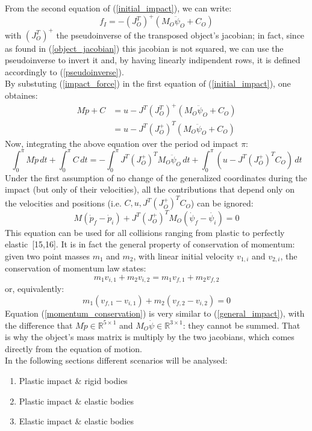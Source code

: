 \documentclass[a4paper,12pt,oneside]{report}
\begin{document}
From the second equation of (\ref{initial_impact}), we can write:
\begin{equation}
  f_I=-(J_O^T)^+(M_O\ddot{\psi}_O+C_O)
  \label{impact_force}
\end{equation}
with $(J_O^T)^+$ the pseudoinverse of the transposed object's jacobian; in fact, since as found in (\ref{object_jacobian}) this jacobian is not squared, we can use the pseudoinverse to invert it and, by having linearly indipendent rows, it is defined accordingly to (\ref{pseudoinverse}).\\
By substuting (\ref{impact_force}) in the first equation of (\ref{initial_impact}), one obtaines:
\begin{equation}
  \begin{split}
  M\ddot{p}+C&=u-J^T(J_O^T)^+(M_O\ddot{\psi}_O+C_O)\\
  &=u-J^T(J_O^+)^T(M_O\ddot{\psi}_O+C_O)
  \end{split}
\end{equation}
Now, integrating the above equation over the period od impact $\pi$:
\begin{equation}
  \int_{0}^{\pi}M\ddot{p}\,dt+\int_{0}^{\pi}C\,dt =-\int_{0}^{\pi}J^T(J_O^+)^TM_O\ddot{\psi}_O\,dt+\int_{0}^{\pi}(u-J^T(J_O^+)^TC_O)\,dt
\end{equation}
Under the first assumption of no change of the generalized coordinates during the impact (but only of their velocities), all the contributions that depend only on the velocities and positions (i.e. $C,u,J^T(J_O^+)^TC_O$) can be ignored:
\begin{equation}
  M(\dot{p}_f-\dot{p}_i)+J^T(J_O^+)^TM_O(\dot{\psi}_f-\dot{\psi_i})=0
  \label{general_impact}
\end{equation}
This equation can be used for all collisions ranging from plastic to perfectly elastic~[15,16]. It is in fact the general property of conservation of momentum:  given two point masses $m_1$ and $m_2$, with linear initial velocity $v_{1,i}$ and $v_{2,i}$, the conservation of momentum law states:
\begin{equation}
  m_1v_{i,1}+m_2v_{i,2}=m_1v_{f,1}+m_2v_{f,2}
\end{equation}
or, equivalently:
\begin{equation}
  m_1(v_{f,1}-v_{i,1})+m_2(v_{f,2}-v_{i,2})=0
  \label{momentum_conservation}
\end{equation}
Equation (\ref{momentum_conservation}) is very similar to (\ref{general_impact}), with the difference that $M\dot{p}\in \mathbb{R}^{5\times 1}$ and $M_O\dot{\psi}\in \mathbb{R}^{3\times 1}$: they cannot be summed. That is why the object's mass matrix is multiply by the two jacobians, which comes directly from the equation of motion.\\
In the following sections different scenarios will be analysed:
\begin{enumerate}
  \item Plastic impact \& rigid bodies
  \item Plastic impact \& elastic bodies
  \item Elastic impact \& elastic bodies
\end{enumerate}
\newpage
\end{document}
